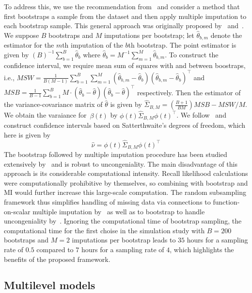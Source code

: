 \documentclass[12pt]{amsart}
\begin{document}
To address this, we use the recommendation from~\cite{Bartlett2020} and consider a method that first bootstraps a sample from the dataset and then apply multiple imputation to each bootstrap sample.  This general approach was originally proposed by~\cite{Shao1994} and~\cite{Little2002}. We suppose $B$ bootstraps and $M$ imputations per bootstrap; let $\hat \theta_{b,m}$ denote the estimator for the $m$th imputation of the $b$th bootstrap.  The point estimator is given by $(B)^{-1} \sum_{b=1}^B \hat \theta_{b}$ where $\hat \theta_b = M^{-1} \sum_{m=1}^M \hat \theta_{b,m}$. To construct the confidence interval, we require mean sum of squares with and between boostraps, i.e., $MSW = \frac{1}{B(M-1)} \sum_{b=1}^B \sum_{m=1}^M (\hat \theta_{b,m} - \hat \theta_b ) (\hat \theta_{b,m} - \hat \theta_b )^\top$ and $MSB = \frac{1}{B-1} \sum_{b=1}^B M \cdot (\hat \theta_b - \hat \theta)(\hat \theta_b - \hat \theta)^\top$ respectively. Then the estimator of the variance-covariance matrix of $\hat \theta$ is given by $\hat \Sigma_{B,M} = \left( \frac{B+1}{BM} \right) MSB - MSW/M$.  We obtain the varaiance for~$\beta(t)$ by $\phi (t) \hat \Sigma_{B,M} \phi(t)^\top$.  We follow~\cite{Bartlett2020} and construct confidence intervals based on Satterthwaite’s degrees of freedom, which here is given by
$$
\hat \nu = \phi (t) \hat \Sigma_{B,M} \phi(t)^\top
$$
The bootstrap followed by multiple imputation procedure has been studied extensively by~\cite{Bartlett2020} and is robust to uncongeniality.  The main disadvantage of this approach is its considerable computational intensity.  Recall likelihood calculations were computationally prohibitive by themselves, so combining with bootstrap and MI would further increase this large-scale computation.  The random subsampling framework thus simplifies handling of missing data via connections to function-on-scalar multiple imputation by~\cite{Petrovich2018} as well as to bootstrap to handle uncongeniality by~\cite{Bartlett2020}. Ignoring the computational time of bootstrap sampling, the computational time for the first choise in the simulation study with $B=200$ bootstraps and $M=2$ imputations per bootstrap leads to $35$ hours for a sampling rate of $0.5$ compared to $7$ hours for a sampling rate of $4$, which highlights the benefits of the proposed framework.




\subsection{Multilevel models}
\end{document}
